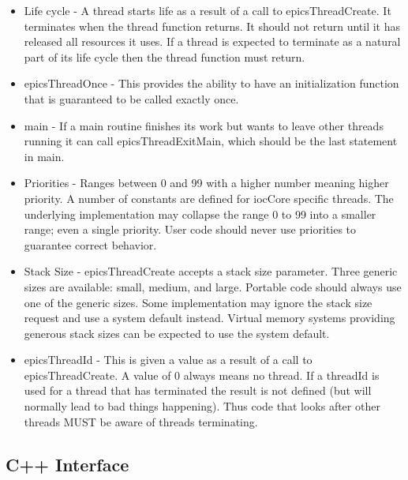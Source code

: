 \begin{itemize}\item Life cycle - A thread starts life as a result of a call to epicsThreadCreate. It terminates when the thread function 
returns. It should not return until it has released all resources it uses. If a thread is expected to terminate as a natural 
part of its life cycle then the thread function must return.

\item epicsThreadOnce - This provides the ability to have an initialization function that is guaranteed to be called exactly 
once.

\item main - If a main routine finishes its work but wants to leave other threads running it can call epicsThreadExitMain, 
which should be the last statement in main.

\item Priorities - Ranges between 0 and 99 with a higher number meaning higher priority. A number of constants are 
defined for iocCore specific threads. The underlying implementation may collapse the range 0 to 99 into a smaller 
range; even a single priority. User code should never use priorities to guarantee correct behavior.

\item Stack Size - epicsThreadCreate accepts a stack size parameter. Three generic sizes are available: small, medium, 
and large. Portable code should always use one of the generic sizes. Some implementation may ignore the stack 
size request and use a system default instead. Virtual memory systems providing generous stack sizes can be 
expected to use the system default.

\item epicsThreadId - This is given a value as a result of a call to epicsThreadCreate. A value of 0 always means no 
thread. If a threadId is used for a thread that has terminated the result is not defined (but will normally lead to bad 
things happening). Thus code that looks after other threads MUST be aware of threads terminating.

\end{itemize}\subsection{C++ Interface}

